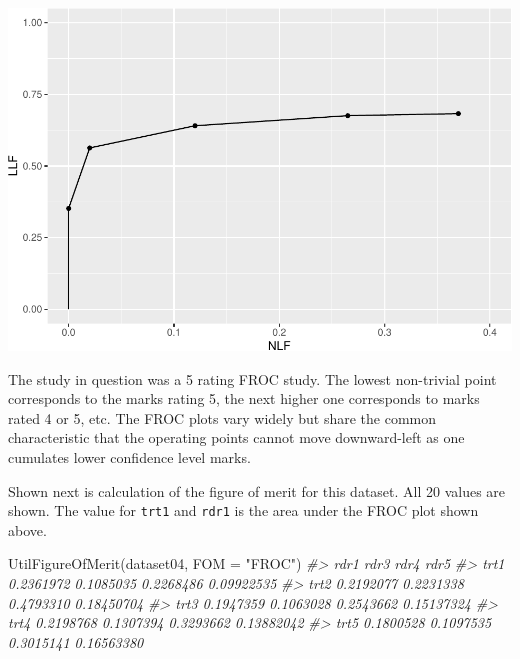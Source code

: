 \documentclass[
]{book}
\newenvironment{Shaded}{\begin{snugshade}}{\end{snugshade}}
\newcommand{\AttributeTok}[1]{\textcolor[rgb]{0.77,0.63,0.00}{#1}}
\newcommand{\CommentTok}[1]{\textcolor[rgb]{0.56,0.35,0.01}{\textit{#1}}}
\newcommand{\DecValTok}[1]{\textcolor[rgb]{0.00,0.00,0.81}{#1}}
\newcommand{\FunctionTok}[1]{\textcolor[rgb]{0.00,0.00,0.00}{#1}}
\newcommand{\NormalTok}[1]{#1}
\newcommand{\OtherTok}[1]{\textcolor[rgb]{0.56,0.35,0.01}{#1}}
\newcommand{\SpecialCharTok}[1]{\textcolor[rgb]{0.00,0.00,0.00}{#1}}
\newcommand{\StringTok}[1]{\textcolor[rgb]{0.31,0.60,0.02}{#1}}
\begin{document}
\begin{Shaded}
\end{Shaded}

\includegraphics{13a-froc-empirical1_files/figure-latex/unnamed-chunk-1-1.pdf}

The study in question was a 5 rating FROC study. The lowest non-trivial point corresponds to the marks rating 5, the next higher one corresponds to marks rated 4 or 5, etc. The FROC plots vary widely but share the common characteristic that the operating points cannot move downward-left as one cumulates lower confidence level marks.

Shown next is calculation of the figure of merit for this dataset. All 20 values are shown. The value for \texttt{trt1} and \texttt{rdr1} is the area under the FROC plot shown above.

\begin{Shaded}
\begin{Highlighting}[]
\FunctionTok{UtilFigureOfMerit}\NormalTok{(dataset04, }\AttributeTok{FOM =} \StringTok{"FROC"}\NormalTok{)}
\CommentTok{\#\textgreater{}           rdr1      rdr3      rdr4       rdr5}
\CommentTok{\#\textgreater{} trt1 0.2361972 0.1085035 0.2268486 0.09922535}
\CommentTok{\#\textgreater{} trt2 0.2192077 0.2231338 0.4793310 0.18450704}
\CommentTok{\#\textgreater{} trt3 0.1947359 0.1063028 0.2543662 0.15137324}
\CommentTok{\#\textgreater{} trt4 0.2198768 0.1307394 0.3293662 0.13882042}
\CommentTok{\#\textgreater{} trt5 0.1800528 0.1097535 0.3015141 0.16563380}
\end{Highlighting}
\end{Shaded}
\end{document}
